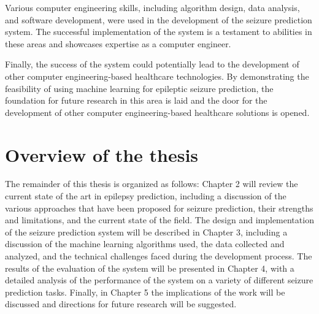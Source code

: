 Various computer engineering skills, including algorithm design, data analysis, and software development, were used in the development of the seizure prediction system. The successful implementation of the system is a testament to abilities in these areas and showcases expertise as a computer engineer.

Finally, the success of the system could potentially lead to the development of other computer engineering-based healthcare technologies. By demonstrating the feasibility of using machine learning for epileptic seizure prediction, the foundation for future research in this area is laid and the door for the development of other computer engineering-based healthcare solutions is opened.

\section{Overview of the thesis}
The remainder of this thesis is organized as follows: Chapter 2 will review the current state of the art in epilepsy prediction, including a discussion of the various approaches that have been proposed for seizure prediction, their strengths and limitations, and the current state of the field. The design and implementation of the seizure prediction system will be described in Chapter 3, including a discussion of the machine learning algorithms used, the data collected and analyzed, and the technical challenges faced during the development process. The results of the evaluation of the system will be presented in Chapter 4, with a detailed analysis of the performance of the system on a variety of different seizure prediction tasks. Finally, in Chapter 5 the implications of the work will be discussed and directions for future research will be suggested.